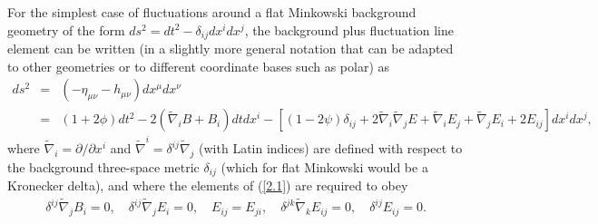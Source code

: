 \documentclass[aps,onecolumn,10pt]{revtex4}
\numberwithin{equation}{section}
\numberwithin{equation}{section}
\begin{document}
For the simplest case of fluctuations around a flat Minkowski background geometry of the form $ds^2=dt^2-\delta_{ij}dx^idx^j$, the background plus fluctuation line element can be written (in a slightly more general notation that can be adapted to other geometries or to different coordinate bases such as polar) as 
%
\begin{eqnarray}
ds^2 &=&(-\eta_{\mu\nu}-h_{\mu\nu})dx^{\mu}dx^{\nu}
\nonumber\\
&=&(1+2\phi) dt^2 -2(\tilde{\nabla}_i B +B_i)dt dx^i - [(1-2\psi)\delta_{ij} +2\tilde{\nabla}_i\tilde{\nabla}_j E + \tilde{\nabla}_i E_j + \tilde{\nabla}_j E_i + 2E_{ij}]dx^i dx^j,
\label{2.1}
\end{eqnarray}
%
where $\tilde{\nabla}_i=\partial/\partial x^i$ and  $\tilde{\nabla}^i=\delta^{ij}\tilde{\nabla}_j$  (with Latin indices) are defined with respect to the background three-space metric $\delta_{ij}$ (which for flat Minkowski would be a Kronecker delta), and where the elements of (\ref{2.1}) are required to obey
%
\begin{eqnarray}
\delta^{ij}\tilde{\nabla}_j B_i = 0,\quad \delta^{ij}\tilde{\nabla}_j E_i = 0, \quad E_{ij}=E_{ji},\quad \delta^{jk}\tilde{\nabla}_kE_{ij} = 0, \quad \delta^{ij}E_{ij} = 0.
\label{2.2}
\end{eqnarray}
%
\end{document}
